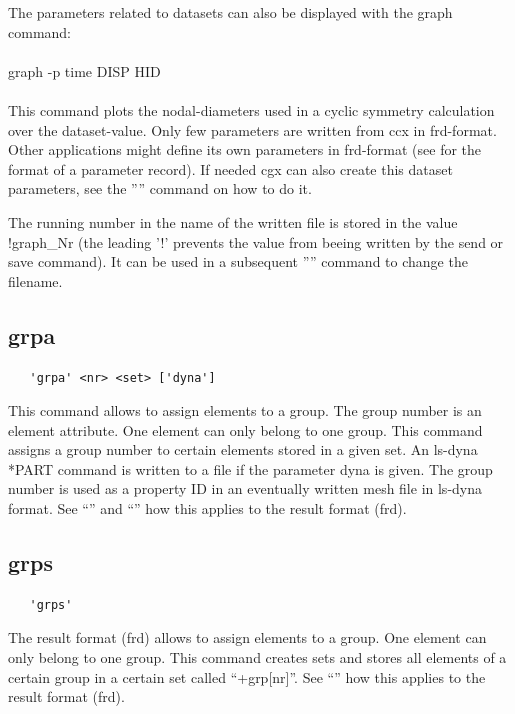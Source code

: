 \documentclass{article}
\begin{document}
The parameters related to datasets can also be displayed with the graph command:\\\\graph -p time DISP HID\\\\This command plots the nodal-diameters used in a cyclic symmetry calculation over the dataset-value. Only few parameters are written from ccx in frd-format. Other applications might define its own parameters in frd-format (see  for the format of a parameter record). If needed cgx can also create this dataset parameters, see the '''' command on how to do it. 

The running number in the name of the written file is stored in the value !graph\_Nr (the leading '!' prevents the value from beeing written by the send or save command). It can be used in a subsequent '''' command to change the filename.

\subsection{\label{grpa}grpa}
\begin{verbatim}
   'grpa' <nr> <set> ['dyna']
\end{verbatim}
This command allows to assign elements to a group. The group number is an element attribute. One element can only belong to one group. This command assigns a group number to certain elements stored in a given set. An ls-dyna *PART command is written to a file if the parameter dyna is given. The group number is used as a property ID in an eventually written mesh file in ls-dyna format. See ``'' and ``'' how this applies to the result format (frd).

\subsection{\label{grps}grps}
\begin{verbatim}
   'grps'
\end{verbatim}
The result format (frd) allows to assign elements to a group. One element can only belong to one group. This command creates sets and stores all elements of a certain group in a certain set called ``+grp[nr]''. See ``'' how this applies to the result format (frd).
\end{document}
